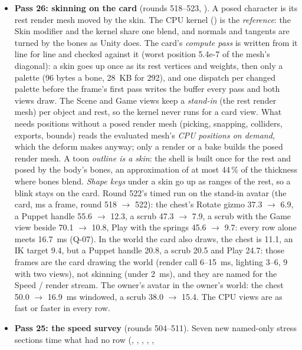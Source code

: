 \begin{itemize}
    400 pieces) are the measurement of B-06; a build of the 100-piece interior is still about 180~ms on a worker, which is
    why nothing builds in a frame.
  \item \textbf{Pass 26: skinning on the card} (rounds 518--523, ). A posed character is its rest render mesh
    moved by the skin. The CPU kernel () is the \emph{reference}: the Skin modifier and the
    kernel share one blend, and normals and tangents are turned by the bones as Unity does. The card's \emph{compute pass}
    is written from it line for line and checked against it (worst position 5.4e-7 of the mesh's diagonal): a skin goes up
    once as its rest vertices and weights, then only a palette (96 bytes a bone, 28~KB for 292), and one dispatch per
    changed palette before the frame's first pass writes the buffer every pass and both views draw. The Scene and Game
    views keep a \emph{stand-in} (the rest render mesh) per object and rest, so the kernel never runs for a card view.
    What needs positions without a posed render mesh (picking, snapping, colliders, exports, bounds) reads the evaluated
    mesh's \emph{CPU positions on demand}, which the deform makes anyway; only a render or a bake builds the posed render
    mesh. A toon \emph{outline is a skin}: the shell is built once for the rest and posed by the body's bones, an
    approximation of at most 44\,\% of the thickness where bones blend. \emph{Shape keys} under a skin go up as ranges of
    the rest, so a blink stays on the card. Round 522's timed run on the stand-in avatar (the card, ms a frame, round 518
    $\to$ 522): the chest's Rotate gizmo 37.3 $\to$ 6.9, a Puppet handle 55.6 $\to$ 12.3, a scrub 47.3 $\to$ 7.9, a scrub with
    the Game view beside 70.1 $\to$ 10.8, Play with the springs 45.6 $\to$ 9.7: every row alone meets 16.7~ms (Q-07). In the
    world the card also draws, the chest is 11.1, an IK target 9.4, but a Puppet handle 20.8, a scrub 20.5 and Play 24.7:
    those frames are the card drawing the world (render call 6--15~ms, lighting 3--6, 9 with two views), not skinning (under 2~ms), and
    they are named for the Speed / render stream. The owner's avatar in the owner's world: the chest 50.0 $\to$ 16.9~ms
    windowed, a scrub 38.0 $\to$ 15.4. The CPU views are as fast or faster in every row.
  \item \textbf{Pass 25: the speed survey} (rounds 504--511). Seven new named-only stress sections time what had no row
    (, , , , ,

\end{itemize}
